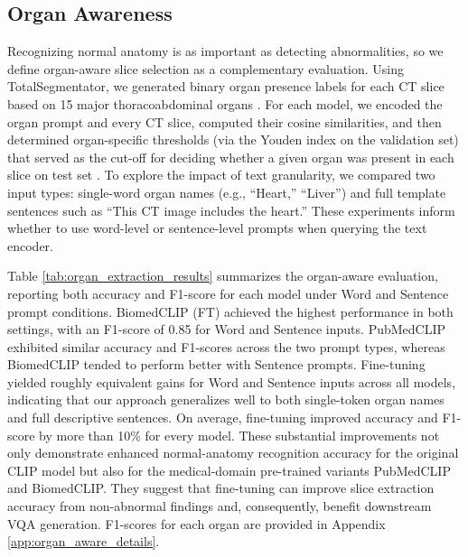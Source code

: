 \documentclass[bioengineering,article,submit,pdftex,moreauthors]{Definitions/mdpi}
\begin{document}
\subsection{Organ Awareness}\label{sec:organ_aware}
Recognizing normal anatomy is as important as detecting abnormalities, so we deﬁne organ-aware slice selection as a complementary evaluation. 
Using TotalSegmentator, we generated binary organ presence labels for each CT slice based on 15 major thoracoabdominal organs \cite{wasserthal_totalsegmentator_2023}. 
For each model, we encoded the organ prompt and every CT slice, computed their cosine similarities, and then determined organ-specific thresholds (via the Youden index on the validation set) that served as the cut-off for deciding whether a given organ was present in each slice on test set \cite{youden_index_1950}. 
To explore the impact of text granularity, we compared two input types: single-word organ names (e.g., “Heart,” “Liver”) and full template sentences such as “This CT image includes the heart.” 
These experiments inform whether to use word-level or sentence-level prompts when querying the text encoder. 


Table \ref{tab:organ_extraction_results} summarizes the organ-aware evaluation, reporting both accuracy and F1-score for each model under Word and Sentence prompt conditions. 
BiomedCLIP (FT) achieved the highest performance in both settings, with an F1-score of 0.85 for Word and Sentence inputs. 
PubMedCLIP exhibited similar accuracy and F1-scores across the two prompt types, whereas BiomedCLIP tended to perform better with Sentence prompts. 
Fine-tuning yielded roughly equivalent gains for Word and Sentence inputs across all models, indicating that our approach generalizes well to both single-token organ names and full descriptive sentences. 
On average, fine-tuning improved accuracy and F1-score by more than 10\% for every model. 
These substantial improvements not only demonstrate enhanced normal-anatomy recognition accuracy for the original CLIP model but also for the medical-domain pre-trained variants PubMedCLIP and BiomedCLIP. 
They suggest that fine-tuning can improve slice extraction accuracy from non-abnormal findings and, consequently, benefit downstream VQA generation.
F1-scores for each organ are provided in Appendix \ref{app:organ_aware_details}.
\end{document}

